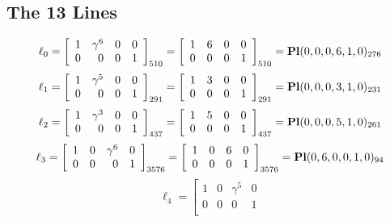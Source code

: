 \documentclass{article}
\begin{document}
{\subsection*{The 13 Lines}
$$
\ell_{0} = 
\left[
\begin{array}{*{4}{r}}
1 & \gamma^{6} & 0 & 0\\
0 & 0 & 0 & 1\\
\end{array}
\right]
_{510}
=
\left[
\begin{array}{*{4}c}
1  & 6  & 0  & 0\\
0  & 0  & 0  & 1\\
\end{array}
\right]_{510}
={\rm\bf Pl}(0,0,0,6,1,0 )_{276}$$
$$
\ell_{1} = 
\left[
\begin{array}{*{4}{r}}
1 & \gamma^{5} & 0 & 0\\
0 & 0 & 0 & 1\\
\end{array}
\right]
_{291}
=
\left[
\begin{array}{*{4}c}
1  & 3  & 0  & 0\\
0  & 0  & 0  & 1\\
\end{array}
\right]_{291}
={\rm\bf Pl}(0,0,0,3,1,0 )_{231}$$
$$
\ell_{2} = 
\left[
\begin{array}{*{4}{r}}
1 & \gamma^{3} & 0 & 0\\
0 & 0 & 0 & 1\\
\end{array}
\right]
_{437}
=
\left[
\begin{array}{*{4}c}
1  & 5  & 0  & 0\\
0  & 0  & 0  & 1\\
\end{array}
\right]_{437}
={\rm\bf Pl}(0,0,0,5,1,0 )_{261}$$
$$
\ell_{3} = 
\left[
\begin{array}{*{4}{r}}
1 & 0 & \gamma^{6} & 0\\
0 & 0 & 0 & 1\\
\end{array}
\right]
_{3576}
=
\left[
\begin{array}{*{4}c}
1  & 0  & 6  & 0\\
0  & 0  & 0  & 1\\
\end{array}
\right]_{3576}
={\rm\bf Pl}(0,6,0,0,1,0 )_{94}$$
$$
\ell_{4} = 
\left[
\begin{array}{*{4}{r}}
1 & 0 & \gamma^{5} & 0\\
0 & 0 & 0 & 1\\

\end{array}$$}
\end{document}
